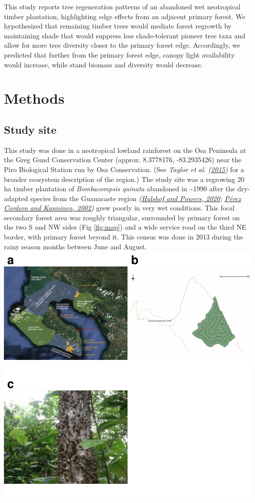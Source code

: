 \documentclass[
  12pt,
]{article}
\begin{document}
This study reports tree regeneration patterns of an abandoned wet neotropical timber plantation, highlighting edge effects from an adjacent primary forest.
We hypothesized that remaining timber trees would mediate forest regrowth by maintaining shade that would suppress less shade-tolerant pioneer tree taxa and allow for more tree diversity closer to the primary forest edge.
Accordingly, we predicted that further from the primary forest edge, canopy light availability would increase, while stand biomass and diversity would decrease.

\hypertarget{methods}{%
\section{Methods}\label{methods}}

\hypertarget{study-site}{%
\subsection{Study site}\label{study-site}}

This study was done in a neotropical lowland rainforest on the Osa Peninsula at the Greg Gund Conservation Center (approx. 8.3778176, -83.2935426) near the Piro Biological Station run by Osa Conservation.
(See \emph{Taylor et al. (\protect\hyperlink{ref-taylor15}{2015})} for a broader ecosystem description of the region.)
The study site was a regrowing 20 ha timber plantation of \emph{Bombacompsis quinata} abandoned in \textasciitilde1990 after the dry-adapted species from the Guanacaste region \emph{(\protect\hyperlink{ref-hulshof20}{Hulshof and Powers, 2020}; \protect\hyperlink{ref-perezcordero02}{Pérez Cordero and Kanninen, 2002})} grew poorly in very wet conditions.
This focal secondary forest area was roughly triangular, surrounded by primary forest on the two S and NW sides (Fig \ref{fig:map}) and a wide service road on the third NE border, with primary forest beyond it.
This census was done in 2013 during the rainy season months between June and August.
\includegraphics{merge_files/figure-latex/map-1.pdf}
\end{document}
